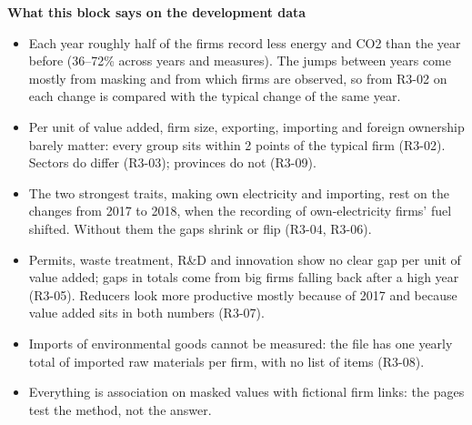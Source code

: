 \medskip
{\small\textbf{What this block says on the development data}}
\begin{itemize}\small
\item Each year roughly half of the firms record less energy and CO2 than the year before (36--72\% across years and
  measures). The jumps between years come mostly from masking and from which firms are observed, so from R3-02 on each change is compared with the typical
  change of the same year.
\item Per unit of value added, firm size, exporting, importing and foreign ownership barely matter: every group sits
  within 2 points of the typical firm (R3-02). Sectors do differ (R3-03); provinces do not (R3-09).
\item The two strongest traits, making own electricity and importing, rest on the changes from 2017 to 2018, when the
  recording of own-electricity firms' fuel shifted. Without them the gaps shrink or flip (R3-04, R3-06).
\item Permits, waste treatment, R\&D and innovation show no clear gap per unit of value added; gaps in totals come from
  big firms falling back after a high year (R3-05). Reducers look more productive mostly because of 2017 and because
  value added sits in both numbers (R3-07).
\item Imports of environmental goods cannot be measured: the file has one yearly total of imported raw materials per
  firm, with no list of items (R3-08).
\item Everything is association on masked values with fictional firm links: the pages test the method, not the answer.
\end{itemize}

